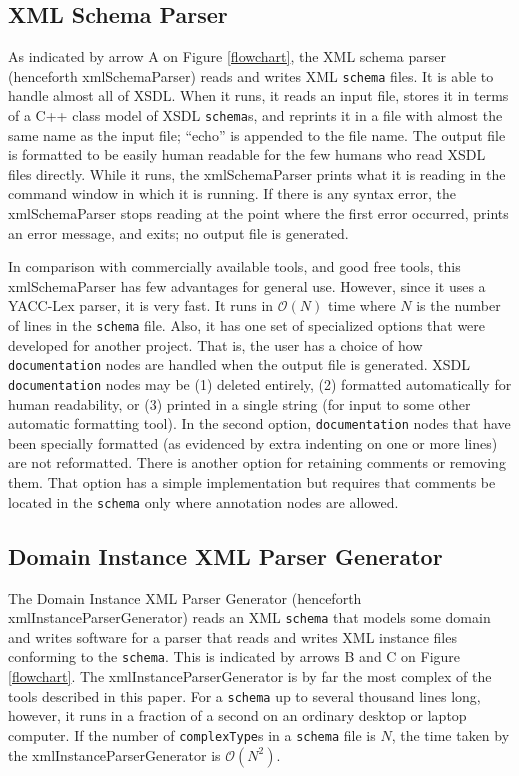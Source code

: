 \documentclass[preprint,12pt]{elsarticle}
\begin{document}
\subsection{XML Schema Parser}
\label{schemaParser}

As indicated by arrow A on Figure \ref{flowchart}, the XML schema parser
(henceforth xmlSchemaParser) reads and writes XML {\tt schema} files. It is
able to handle almost all of XSDL. When it runs, it reads an input file,
stores it in terms of a C++ class model of XSDL {\tt schema}s, and reprints
it in a file with almost the same name as the input file; ``echo'' is
appended to the file name. The output file is formatted to be easily human
readable for the few humans who read XSDL files directly. While it runs,
the xmlSchemaParser prints what it is reading in the command window in
which it is running. If there is any syntax error, the xmlSchemaParser
stops reading at the point where the first error occurred, prints an error
message, and exits; no output file is generated.

In comparison with commercially available tools, and good free tools, this
xmlSchemaParser has few advantages for general use. However, since it uses
a YACC-Lex parser, it is very fast. It runs in $\mathcal{O}{(N)}$ time
where ${N}$ is the number of lines in the {\tt schema} file. Also, it has
one set of specialized options that were developed for another project.
That is, the user has a choice of how {\tt documentation} nodes are handled
when the output file is generated. XSDL {\tt documentation} nodes may be
(1) deleted entirely, (2) formatted automatically for human readability, or
(3) printed in a single string (for input to some other automatic
formatting tool). In the second option, {\tt documentation} nodes that have
been specially formatted (as evidenced by extra indenting on one or more
lines) are not reformatted. There is another option for retaining comments
or removing them. That option has a simple implementation but requires that
comments be located in the {\tt schema} only where annotation nodes are
allowed.

\subsection{Domain Instance XML Parser Generator}
\label{parserGenerator}

The Domain Instance XML Parser Generator (henceforth
xmlInstanceParserGenerator) reads an XML {\tt schema} that models some
domain and writes software for a parser that reads and writes XML instance
files conforming to the {\tt schema}. This is indicated by arrows B and C
on Figure \ref{flowchart}. The xmlInstanceParserGenerator is by far the
most complex of the tools described in this paper. For a {\tt schema} up to
several thousand lines long, however, it runs in a fraction of a second on
an ordinary desktop or laptop computer. If the number of {\tt complexType}s
in a {\tt schema} file is ${N}$, the time taken by the
xmlInstanceParserGenerator is $\mathcal{O}{(N^2)}$.
\end{document}
